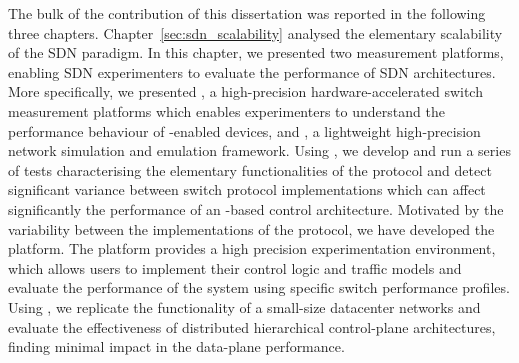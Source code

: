 The bulk of the contribution of this dissertation was reported in the following
three chapters. Chapter~\ref{sec:sdn_scalability} analysed the elementary
scalability of the SDN paradigm. In this chapter, we presented two measurement
platforms, enabling SDN experimenters to evaluate the performance of SDN
architectures. More specifically, we presented \oflops, a high-precision
hardware-accelerated \of switch measurement platforms which enables
experimenters to understand the performance behaviour of \of-enabled devices,
and \sdnsim, a lightweight high-precision network simulation and emulation
framework. Using \oflops, we develop and run a series of tests characterising the
elementary functionalities of the \of protocol and detect significant variance
between switch protocol implementations which can affect significantly the 
performance of an \of-based control architecture. Motivated by the variability
between the implementations  of the \of protocol, we have developed the \sdnsim
platform. The \sdnsim platform provides a high precision experimentation
environment, which allows users to implement their control logic and traffic
models and evaluate the performance of the system using specific switch
performance profiles. Using \sdnsim, we replicate the functionality of a small-size 
datacenter networks and evaluate the effectiveness of distributed hierarchical
control-plane architectures, finding minimal impact in the data-plane
performance.  


